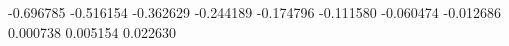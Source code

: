 -0.696785
-0.516154
-0.362629
-0.244189
-0.174796
-0.111580
-0.060474
-0.012686
0.000738
0.005154
0.022630
